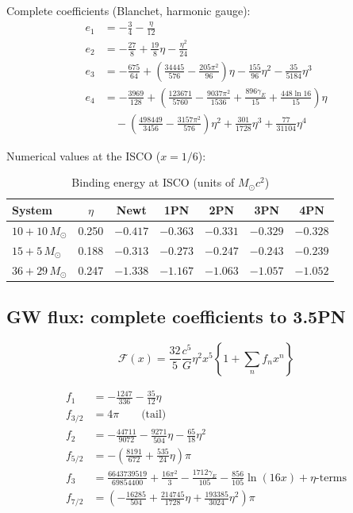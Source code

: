 \documentclass[11pt,a4paper]{article}
\theoremstyle{plain}
\theoremstyle{definition}
\theoremstyle{remark}
\newcommand{\Ms}{M_\odot}
\begin{document}
Complete coefficients (Blanchet, harmonic gauge):
\begin{align}
  e_1 &= -\frac{3}{4} - \frac{\eta}{12} \label{eq:e1} \\
  e_2 &= -\frac{27}{8} + \frac{19}{8}\eta - \frac{\eta^2}{24} \label{eq:e2} \\
  e_3 &= -\frac{675}{64} + \left(\frac{34445}{576} - \frac{205\pi^2}{96}\right)\eta - \frac{155}{96}\eta^2 - \frac{35}{5184}\eta^3 \label{eq:e3} \\
  e_4 &= -\frac{3969}{128} + \left(\frac{123671}{5760} - \frac{9037\pi^2}{1536} + \frac{896\gamma_E}{15} + \frac{448\ln16}{15}\right)\eta \nonumber \\
  &\quad - \left(\frac{498449}{3456} - \frac{3157\pi^2}{576}\right)\eta^2 + \frac{301}{1728}\eta^3 + \frac{77}{31104}\eta^4 \label{eq:e4}
\end{align}

Numerical values at the ISCO ($x = 1/6$):

\begin{table}[h]
  \centering
  \caption{Binding energy at ISCO (units of $\Ms c^2$)}
  \begin{tabular}{@{}lcccccc@{}}
    \toprule
    System & $\eta$ & Newt & 1PN & 2PN & 3PN & 4PN \\
    \midrule
    $10+10\,\Ms$ & 0.250 & $-0.417$ & $-0.363$ & $-0.331$ & $-0.329$ & $-0.328$ \\
    $15+5\,\Ms$ & 0.188 & $-0.313$ & $-0.273$ & $-0.247$ & $-0.243$ & $-0.239$ \\
    $36+29\,\Ms$ & 0.247 & $-1.338$ & $-1.167$ & $-1.063$ & $-1.057$ & $-1.052$ \\
    \bottomrule
  \end{tabular}
\end{table}

\subsection{GW flux: complete coefficients to 3.5PN}

\begin{equation}
  \mathcal{F}(x) = \frac{32}{5}\frac{c^5}{G}\eta^2 x^5\left\{1 + \sum_n f_n x^n\right\}
\end{equation}

\begin{align}
  f_1 &= -\frac{1247}{336} - \frac{35}{12}\eta \\
  f_{3/2} &= 4\pi \qquad\text{(tail)} \\
  f_2 &= -\frac{44711}{9072} - \frac{9271}{504}\eta - \frac{65}{18}\eta^2 \\
  f_{5/2} &= -\left(\frac{8191}{672} + \frac{535}{24}\eta\right)\pi \\
  f_3 &= \frac{6643739519}{69854400} + \frac{16\pi^2}{3} - \frac{1712\gamma_E}{105} - \frac{856}{105}\ln(16x) + \eta\text{-terms} \\
  f_{7/2} &= \left(-\frac{16285}{504} + \frac{214745}{1728}\eta + \frac{193385}{3024}\eta^2\right)\pi
\end{align}
\end{document}

